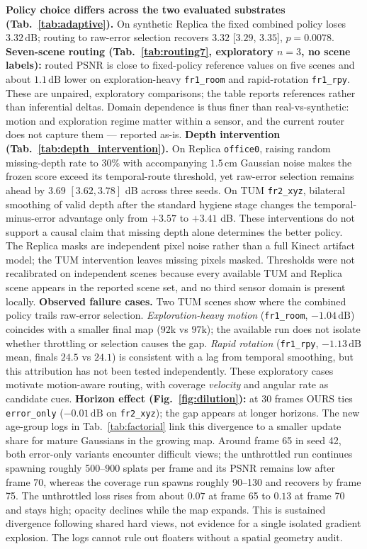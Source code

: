 \documentclass[10pt,twocolumn,letterpaper]{article}
\begin{document}
\textbf{Policy choice differs across the two evaluated substrates (Tab.~\ref{tab:adaptive}).}
On synthetic Replica the fixed combined policy loses $3.32\,\mathrm{dB}$; routing to raw-error selection recovers $3.32$ [$3.29$, $3.35$], $p = 0.0078$.
\textbf{Seven-scene routing (Tab.~\ref{tab:routing7}, exploratory $n=3$, no scene labels):} routed PSNR is close to fixed-policy reference values on five scenes and about $1.1\,\mathrm{dB}$ lower on exploration-heavy \texttt{fr1\_room} and rapid-rotation \texttt{fr1\_rpy}. These are unpaired, exploratory comparisons; the table reports references rather than inferential deltas.
Domain dependence is thus finer than real-vs-synthetic: motion and exploration regime matter within a sensor, and the current router does not capture them --- reported as-is.
\textbf{Depth intervention (Tab.~\ref{tab:depth_intervention}).} On Replica \texttt{office0}, raising random missing-depth rate to 30\% with accompanying $1.5\,\mathrm{cm}$ Gaussian noise makes the frozen score exceed its temporal-route threshold, yet raw-error selection remains ahead by $3.69$ $[3.62,3.78]$ dB across three seeds. On TUM \texttt{fr2\_xyz}, bilateral smoothing of valid depth after the standard hygiene stage changes the temporal-minus-error advantage only from $+3.57$ to $+3.41$ dB. These interventions do not support a causal claim that missing depth alone determines the better policy. The Replica masks are independent pixel noise rather than a full Kinect artifact model; the TUM intervention leaves missing pixels masked. Thresholds were not recalibrated on independent scenes because every available TUM and Replica scene appears in the reported scene set, and no third sensor domain is present locally.
\textbf{Observed failure cases.} Two TUM scenes show where the combined policy trails raw-error selection.
\textit{Exploration-heavy motion} (\texttt{fr1\_room}, $-1.04\,\mathrm{dB}$) coincides with a smaller final map ($92\mathrm{k}$ vs $97\mathrm{k}$); the available run does not isolate whether throttling or selection causes the gap.
\textit{Rapid rotation} (\texttt{fr1\_rpy}, $-1.13\,\mathrm{dB}$ mean, finals $24.5$ vs $24.1$) is consistent with a lag from temporal smoothing, but this attribution has not been tested independently.
These exploratory cases motivate motion-aware routing, with coverage \textit{velocity} and angular rate as candidate cues.
\textbf{Horizon effect (Fig.~\ref{fig:dilution}):} at 30 frames OURS ties \texttt{error\_only} ($-0.01\,\mathrm{dB}$ on \texttt{fr2\_xyz}); the gap appears at longer horizons. The new age-group logs in Tab.~\ref{tab:factorial} link this divergence to a smaller update share for mature Gaussians in the growing map.
Around frame 65 in seed 42, both error-only variants encounter difficult views; the unthrottled run continues spawning roughly 500--900 splats per frame and its PSNR remains low after frame 70, whereas the coverage run spawns roughly 90--130 and recovers by frame 75. The unthrottled loss rises from about $0.07$ at frame 65 to $0.13$ at frame 70 and stays high; opacity declines while the map expands. This is sustained divergence following shared hard views, not evidence for a single isolated gradient explosion. The logs cannot rule out floaters without a spatial geometry audit.
\end{document}
